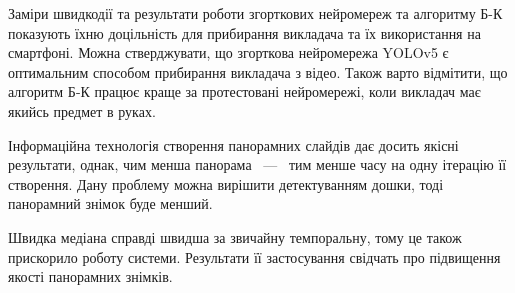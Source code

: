\chapterConclusion

Заміри швидкодії та результати роботи згорткових нейромереж та алгоритму Б-К показують
їхню доцільність для прибирання викладача та їх використання на смартфоні. 
Можна стверджувати, що згорткова нейромережа YOLOv5 є оптимальним способом
прибирання викладача з відео. Також варто відмітити, що алгоритм Б-К
працює краще за протестовані нейромережі,
коли викладач має якийсь предмет в руках. 


Інформаційна технологія створення панорамних слайдів дає досить якісні результати, 
однак, чим менша панорама ~---~ тим менше часу на одну ітерацію її створення. Дану проблему 
можна вирішити детектуванням дошки, тоді панорамний знімок буде менший. 

Швидка медіана справді швидша за звичайну темпоральну, тому це також
прискорило роботу системи. Результати її застосування свідчать про підвищення
якості панорамних знімків.
